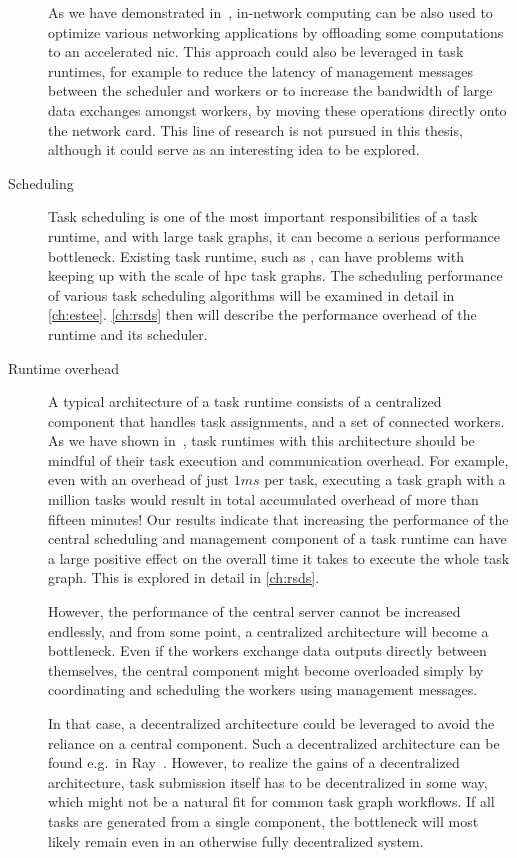 \begin{description}
		As we have demonstrated in~\cite{pspin, spin2}, in-network computing can be also used to
		optimize various networking applications by offloading some computations to an accelerated
		\gls{nic}. This approach could also be leveraged in task runtimes, for example to
		reduce the latency of management messages between the scheduler and workers or to increase the
		bandwidth of large data exchanges amongst workers, by moving these operations directly onto the
		network card. This line of research is not pursued in this thesis, although it could serve as an
		interesting idea to be explored.
	\item[Scheduling] Task scheduling is one of the most important responsibilities of a task runtime, and with large
		task graphs, it can become a serious performance bottleneck. Existing task runtime, such as
		\dask{}, can have problems with keeping up with the scale of
		\gls{hpc} task graphs. The scheduling performance of various task scheduling
		algorithms will be examined in detail in \autoref{ch:estee}. \autoref{ch:rsds}
		then will describe the performance overhead of the \dask{} runtime and its
		scheduler.
	\item[Runtime overhead] A typical architecture of a task runtime consists of a centralized component that handles task
		assignments, and a set of connected workers. As we have shown in~\cite{rsds}, task
		runtimes with this architecture should be mindful of their task execution and communication
		overhead. For example, even with an overhead of just $1ms$ per task, executing
		a task graph with a million tasks would result in total accumulated overhead of more than fifteen
		minutes! Our results indicate that increasing the performance of the central scheduling and
		management component of a task runtime can have a large positive effect on the overall time it
		takes to execute the whole task graph. This is explored in detail in \autoref{ch:rsds}.

		However, the performance of the central server cannot be increased endlessly, and from some point,
		a centralized architecture will become a bottleneck. Even if the workers exchange data outputs
		directly between themselves, the central component might become overloaded simply by coordinating
		and scheduling the workers using management messages.

		In that case, a decentralized architecture could be leveraged to avoid the reliance on a central
		component. Such a decentralized architecture can be found e.g.\ in Ray~\cite{ray}.
		However, to realize the gains of a decentralized architecture, task submission itself has to be
		decentralized in some way, which might not be a natural fit for common task graph workflows. If all
		tasks are generated from a single component, the bottleneck will most likely remain even in an
		otherwise fully decentralized system.
\end{description}

